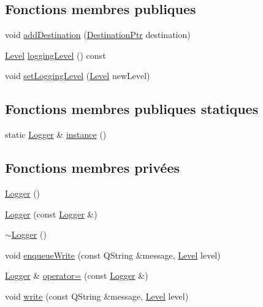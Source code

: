 \subsection*{Fonctions membres publiques}
\begin{DoxyCompactItemize}
\item 
void \hyperlink{classQsLogging_1_1Logger_a76a32c839e837547b14bc5e523b4aa45}{add\-Destination} (\hyperlink{namespaceQsLogging_a8fe41cf859d617f1c23515f804d1e8ec}{Destination\-Ptr} destination)
\item 
\hyperlink{namespaceQsLogging_a38c7dd87e4de6f8eb460763ad0baa033}{Level} \hyperlink{classQsLogging_1_1Logger_a5e2b29cf6cd066f1e64eaa4db7373458}{logging\-Level} () const 
\item 
void \hyperlink{classQsLogging_1_1Logger_aa34d1a0d83e180f15e23a03f9de872c6}{set\-Logging\-Level} (\hyperlink{namespaceQsLogging_a38c7dd87e4de6f8eb460763ad0baa033}{Level} new\-Level)
\end{DoxyCompactItemize}
\subsection*{Fonctions membres publiques statiques}
\begin{DoxyCompactItemize}
\item 
static \hyperlink{classQsLogging_1_1Logger}{Logger} \& \hyperlink{classQsLogging_1_1Logger_a26fd3242d362eeeb3b38940a714ea6fa}{instance} ()
\end{DoxyCompactItemize}
\subsection*{Fonctions membres privées}
\begin{DoxyCompactItemize}
\item 
\hyperlink{classQsLogging_1_1Logger_ac9f74e9b0b16e9110386edb0c6eca541}{Logger} ()
\item 
\hyperlink{classQsLogging_1_1Logger_ab7222678ba738772cf06f997243b3d1d}{Logger} (const \hyperlink{classQsLogging_1_1Logger}{Logger} \&)
\item 
\hyperlink{classQsLogging_1_1Logger_a0947daaf6db4f83ba6e5fe155fa84e1f}{$\sim$\-Logger} ()
\item 
void \hyperlink{classQsLogging_1_1Logger_acd6d5d16d6e111eaa960807d75549bf9}{enqueue\-Write} (const Q\-String \&message, \hyperlink{namespaceQsLogging_a38c7dd87e4de6f8eb460763ad0baa033}{Level} level)
\item 
\hyperlink{classQsLogging_1_1Logger}{Logger} \& \hyperlink{classQsLogging_1_1Logger_a1a82528a35b99a5a00b42149ee75be2e}{operator=} (const \hyperlink{classQsLogging_1_1Logger}{Logger} \&)
\item 
void \hyperlink{classQsLogging_1_1Logger_ab9789bba5f1644a3b3b51606533aa20f}{write} (const Q\-String \&message, \hyperlink{namespaceQsLogging_a38c7dd87e4de6f8eb460763ad0baa033}{Level} level)
\end{DoxyCompactItemize}
